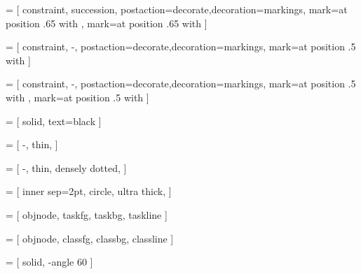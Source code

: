  = [
  constraint,
  succession,
  postaction={decorate,decoration={markings,
   mark=at position .65 with {},
   mark=at position .65 with {}
  }}
]



 = [
  constraint,
  -,
  postaction={decorate,decoration={markings,
   mark=at position .5 with {} 
  }}
]

 = [
  constraint,
  -,
  postaction={decorate,decoration={markings,
   mark=at position .5 with {},
    mark=at position .5 with {} 
  }}
]







 = [
  solid,
  text=black
]

 = [
  -,
  thin,
  ]
  
 = [
  -,
  thin,
  densely dotted,
  ]
  

 = [
  inner sep=2pt,
  circle,
  ultra thick,
]

 = [
  objnode,
  taskfg,
  taskbg,
  taskline
]

 = [
  objnode,
  classfg,
  classbg,
  classline
]

 = [
  solid,
  -angle 60
]

